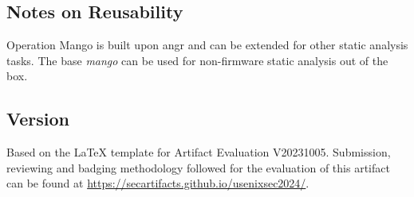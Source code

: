 \subsection{Notes on Reusability}
\label{sec:reuse}
Operation Mango is built upon angr and can be extended for other static analysis tasks.
The base \textit{mango} can be used for non-firmware static analysis out of the box.



\subsection{Version}
Based on the LaTeX template for Artifact Evaluation V20231005. Submission,
reviewing and badging methodology followed for the evaluation of this artifact
can be found at \url{https://secartifacts.github.io/usenixsec2024/}.